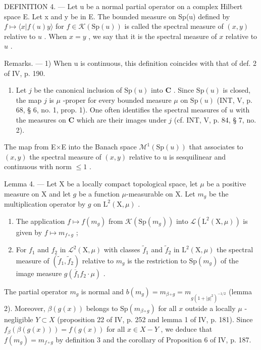 DEFINITION 4. --- Let u be a normal partial operator on a complex Hilbert space E. Let x and y be in E. The bounded measure on Sp(u) defined by \(f \mapsto \langle x | f(u)y \rangle\) for \(f \in \mathcal{K}(\mathrm{Sp}(u))\) is called the spectral measure of \((x,y)\) relative to \(u\) . When \(x = y\) , we say that it is the spectral measure of \(x\) relative to \(u\) .

Remarks. --- 1) When u is continuous, this definition coincides with that of def. 2 of IV, p. 190.

\begin{enumerate}
\def\labelenumi{\arabic{enumi})}
\setcounter{enumi}{1}
\tightlist
\item
  Let \(j\) be the canonical inclusion of \(\mathrm{Sp}(u)\) into \(\mathbf{C}\) . Since \(\mathrm{Sp}(u)\) is closed, the map \(j\) is \(\mu\) -proper for every bounded measure \(\mu\) on \(\mathrm{Sp}(u)\) (INT, V, p. 68, § 6, no. 1, prop. 1). One often identifies the spectral measures of \(u\) with the measures on \(\mathbf{C}\) which are their images under \(j\) (cf. INT, V, p. 84, § 7, no. 2).
\end{enumerate}

The map from E×E into the Banach space \(\mathcal{M}^{1}(\mathrm{Sp}(u))\) that associates to \((x,y)\) the spectral measure of \((x,y)\) relative to u is sesquilinear and continuous with norm \(\leqslant 1\) .

Lemma 4. --- Let X be a locally compact topological space, let \(\mu\) be a positive measure on X and let \(g\) be a function \(\mu\)-measurable on X. Let \(m_g\) be the multiplication operator by \(g\) on \(\mathrm{L}^2 (\mathrm{X},\mu)\) .

\begin{enumerate}
\def\labelenumi{\alph{enumi})}
\item
  The application \(f\mapsto f(m_{g})\) from \(\mathcal{K}(\mathrm{Sp}(m_g))\) into \(\mathcal{L}(\mathrm{L}^{2}(\mathrm{X},\mu))\) is given by \(f\mapsto m_{f\circ g}\) ;
\item
  For \(f_1\) and \(f_2\) in \(\mathcal{L}^2(\mathrm{X},\mu)\) with classes \(\widetilde{f}_1\) and \(\widetilde{f}_2\) in \(\mathrm{L}^2(\mathrm{X},\mu)\) the spectral measure of \((\widetilde{f}_1,\widetilde{f}_2)\) relative to \(m_g\) is the restriction to \(\mathrm{Sp}(m_g)\) of the image measure \(g(\overline{f}_1f_2\cdot \mu)\) .
\end{enumerate}

The partial operator \(m_g\) is normal and \(b(m_g) = m_{\beta \circ g} = m_{g(1+|g|^2)^{-1/2}}\) (lemma 2). Moreover, \(\beta(g(x))\) belongs to \(\mathrm{Sp}(m_{\beta \circ g})\) for all \(x\) outside a locally \(\mu\) -negligible \(Y \subset X\) (proposition 22 of IV, p. 252 and lemma 1 of IV, p. 181). Since \(f_\beta(\beta(g(x))) = f(g(x))\) for all \(x \in X - Y\) , we deduce that \(f(m_g) = m_{f \circ g}\) by definition 3 and the corollary of Proposition 6 of IV, p. 187.

